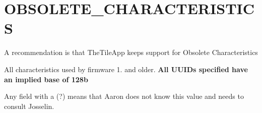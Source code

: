\hypertarget{group___o_b_s_o_l_e_t_e___c_h_a_r_a_c_t_e_r_i_s_t_i_c_s}{}\section{O\+B\+S\+O\+L\+E\+T\+E\+\_\+\+C\+H\+A\+R\+A\+C\+T\+E\+R\+I\+S\+T\+I\+CS}
\label{group___o_b_s_o_l_e_t_e___c_h_a_r_a_c_t_e_r_i_s_t_i_c_s}
A recommendation is that The\+Tile\+App keeps support for Obsolete Characteristics

All characteristics used by firmware 1. and older. {\bfseries All U\+U\+I\+Ds specified have an implied base of 128b}

Any field with a (?) means that Aaron does not know this value and needs to consult Josselin.

